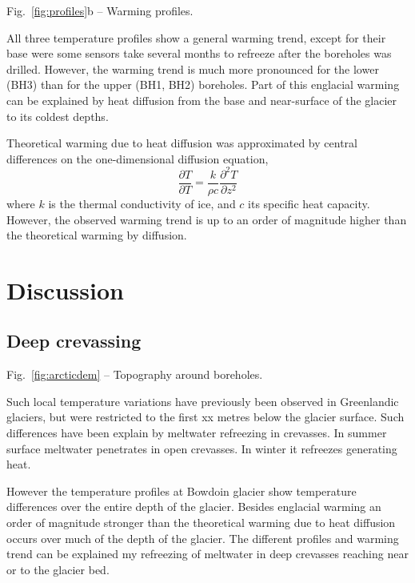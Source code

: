 \documentclass[utf8]{article}
\begin{document}
    Fig.~\ref{fig:profiles}b -- Warming profiles.

    All three temperature profiles show a general warming trend, except for
    their base were some sensors take several months to refreeze after the
    boreholes was drilled.  However, the warming trend is much more pronounced
    for the lower (BH3) than for the upper (BH1, BH2) boreholes. Part of this
    englacial warming can be explained by heat diffusion from the base and
    near-surface of the glacier to its coldest depths.

    Theoretical warming due to heat diffusion was approximated by central
    differences on the one-dimensional diffusion equation,
    \begin{equation}
      \frac{\partial T}{\partial T} =
        \frac{k}{\rho c} \frac{\partial^2 T}{\partial z^2}
    \end{equation}
    where $k$ is the thermal conductivity of ice, and $c$ its specific heat
    capacity. However, the observed warming trend is up to an order of
    magnitude higher than the theoretical warming by diffusion.


\section{Discussion}

\subsection{Deep crevassing}

    Fig.~\ref{fig:arcticdem} -- Topography around boreholes.

    Such local temperature variations have previously been observed in
    Greenlandic glaciers, but were restricted to the first xx metres below
    the glacier surface. Such differences have been explain by meltwater
    refreezing in crevasses. In summer surface meltwater penetrates in open
    crevasses. In winter it refreezes generating heat.

    However the temperature profiles at Bowdoin glacier show temperature
    differences over the entire depth of the glacier. Besides englacial warming
    an order of magnitude stronger than the theoretical warming due to heat
    diffusion occurs over much of the depth of the glacier. The different
    profiles and warming trend can be explained my refreezing of meltwater
    in deep crevasses reaching near or to the glacier bed.
\end{document}
